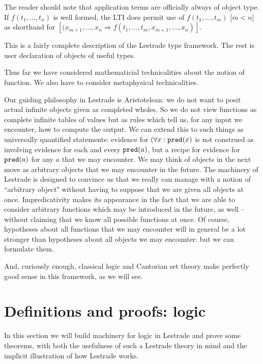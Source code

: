 \documentclass[12pt]{article}
\begin{document}
The reader should note that application terms are officially always of object type.  If $f(t_1,\ldots,t_n)$ is well formed, the LTI  does permit use of $f(t_1,\ldots,t_m)$ [$m<n$] as shorthand for $[(x_{m+1},\ldots,x_n\Rightarrow f(t_1,\ldots,t_m,x_{m+1},\ldots,x_n)]$.

This is a fairly complete description of the Lestrade type framework.  The rest is user declaration of objects of useful types.

Thus far we have considered mathematicial technicalities about the notion of function.  We also have to consider metaphysical technicalities.

Our guiding philosophy in Lestrade is Aristotelean:  we do not want to posit actual infinite objects given as completed wholes.
So we do not view functions as complete infinite tables of values but as rules which tell us, for any input we encounter, how to compute the output.  We can extend this to such things as universally quantified statements:  evidence for $(\forall x:{\tt pred}(x)$ is not construed as involving evidence for each and every ${\tt pred}(a)$, but a recipe for evidence for ${\tt pred}(a)$ for any $a$ that we may encounter.  We may think of objects in the next move as arbitrary objects that we may encounter in the future.  The machinery of Lestrade is designed to convince us that we really can manage with a notion of ``arbitrary object" without having to suppose that we are given all objects at once.  Impredicativity makes its appearance in the fact that we are able to consider arbitrary functions which may be introduced in the future, as well -- without claiming that we know all possible functions at once.  Of course, hypotheses about all functions that we may encounter will in general be a lot stronger than hypotheses about all objects we may encounter:  but we can formulate them.

And, curiously enough, classical logic and Cantorian set theory make perfectly good sense in this framework, as we will see.

\newpage

\section{Definitions and proofs: logic}

In this section we will build machinery for logic in Lestrade and prove some theorems, with both the usefulness of such a Lestrade theory in mind and the implicit illustration of how Lestrade works.
\end{document}
